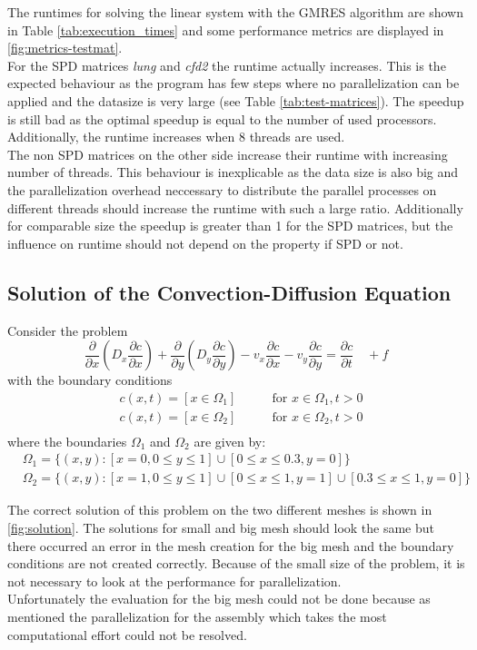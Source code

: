 \documentclass{article}
\begin{document}
The runtimes for solving the linear system with the GMRES algorithm are shown in Table \ref{tab:execution_times} and some performance metrics are displayed in \ref{fig:metrics-testmat}.\\
For the SPD matrices \textit{lung} and \textit{cfd2} the runtime actually increases. This is the expected behaviour as the program has few steps where no parallelization can be applied and the datasize is very large (see Table \ref{tab:test-matrices}). The speedup is still bad as the optimal speedup is equal to the number of used processors. Additionally, the runtime increases when 8 threads are used. \\
The non SPD matrices on the other side increase their runtime with increasing number of threads. This behaviour is inexplicable as the data size is also big and the parallelization overhead neccessary to distribute the parallel processes on different threads should increase the runtime with such a large ratio. Additionally for comparable size the speedup is greater than 1 for the SPD matrices, but the influence on runtime should not depend on the property if SPD or not.
\newpage
\subsection{Solution of the Convection-Diffusion Equation}
Consider the  problem
$$
\frac{\partial}{\partial x}\left(D_{x} \frac{\partial c}{\partial x}\right)+\frac{\partial}{\partial y}\left(D_{y} \frac{\partial c}{\partial y}\right)-v_{x} \frac{\partial c}{\partial x}-v_{y} \frac{\partial c}{\partial y}=\frac{\partial c}{\partial t} \quad+f
$$
with the boundary conditions
$$
\begin{aligned}
	& c(x, t) = [x \in \Omega_1] \qquad & \text{for } x \in \Omega_1, t > 0 \\
	& c(x, t) = [x \in \Omega_2] \qquad & \text{for } x \in \Omega_2, t > 0 \\
\end{aligned}
$$
where the boundaries $\Omega_1$ and $\Omega_2$ are given by:
$$
\begin{aligned}
	& \Omega_1=\{(x, y):[x=0,0 \leq y \leq 1] \cup[0 \leq x \leq 0.3, y=0]\} \\
	& \Omega_2=\{(x, y):[x=1,0 \leq y \leq 1] \cup[0 \leq x \leq 1, y=1] \cup[0.3 \leq x \leq 1, y=0]\}
\end{aligned}
$$


The correct solution of this problem on the two different meshes is shown in \ref{fig:solution}. The solutions for small and big mesh should look the same but there occurred an error in the mesh creation for the big mesh and the boundary conditions are not created correctly. Because of the small size of the problem, it is not necessary to look at the performance for parallelization.\\
Unfortunately the evaluation for the big mesh could not be done because as mentioned the parallelization for the assembly which takes the most computational effort could not be resolved.
\end{document}
